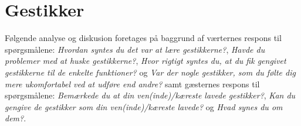 \section{Gestikker}
\label{TestresultaterSocialAcceptGestikker}
%
Følgende analyse og diskusion foretages på baggrund af værternes respons til spørgsmålene: \textit{Hvordan syntes du det var at lære gestikkerne?}, \textit{Havde du problemer med at huske gestikkerne?}, \textit{Hvor rigtigt syntes du, at du fik gengivet gestikkerne til de enkelte funktioner?} og \textit{Var der nogle gestikker, som du følte dig mere ukomfortabel ved at udføre end andre?} samt gæsternes respons til spørgsmålene: \textit{Bemærkede du at din ven(inde)/kæreste lavede gestikker?}, \textit{Kan du gengive de gestikker som din ven(inde)/kæreste lavede?} og \textit{Hvad synes du om dem?}.\blankline
%
